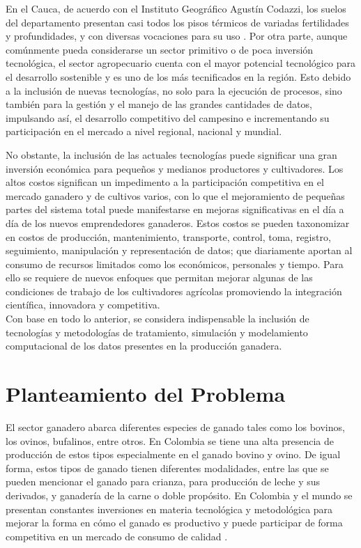 En el Cauca, de acuerdo con el Instituto Geográfico Agustín Codazzi, los suelos del departamento presentan casi todos los pisos térmicos de variadas fertilidades y profundidades, y con diversas vocaciones para su uso \cite{igac}. Por otra parte, aunque comúnmente pueda considerarse un sector primitivo o de poca inversión tecnológica, el sector agropecuario cuenta con el mayor potencial tecnológico para el desarrollo sostenible y es uno de los más tecnificados en la región. Esto debido a la inclusión de nuevas tecnologías, no solo para la ejecución de procesos, sino también para la gestión y el manejo de las grandes cantidades de datos, impulsando así, el desarrollo competitivo del campesino e incrementando su participación en el mercado a nivel regional, nacional y mundial.

No obstante, la inclusión de las actuales tecnologías puede significar una gran inversión económica para pequeños y medianos productores y cultivadores. Los altos costos significan un impedimento a la participación competitiva en el mercado ganadero y de cultivos varios, con lo que el mejoramiento de pequeñas partes del sistema total puede manifestarse en mejoras significativas en el día a día de los nuevos emprendedores ganaderos. Estos costos se pueden taxonomizar en costos de producción, mantenimiento, transporte, control, toma, registro, seguimiento, manipulación y representación de datos; que diariamente aportan al consumo de recursos limitados como los económicos, personales y tiempo. Para ello se requiere de nuevos enfoques que permitan mejorar algunas de las condiciones de trabajo de los cultivadores agrícolas promoviendo la integración científica, innovadora y competitiva.\\

Con base en todo lo anterior, se considera indispensable la inclusión de tecnologías y metodologías de tratamiento, simulación y modelamiento computacional de los datos presentes en la producción ganadera.


\section{Planteamiento del Problema}

El sector ganadero abarca diferentes especies de ganado tales como los bovinos, los ovinos, bufalinos, entre otros. En Colombia se tiene una alta presencia de producción de estos tipos especialmente en el ganado bovino y ovino. De igual forma, estos tipos de ganado tienen diferentes modalidades, entre las que se pueden mencionar el ganado para crianza, para producción de leche y sus derivados, y ganadería de la carne o doble propósito. En Colombia y el mundo se presentan constantes inversiones en materia tecnológica y metodológica para mejorar la forma en cómo el ganado es productivo y puede participar de forma competitiva en un mercado de consumo de calidad \cite{fao}.\\

